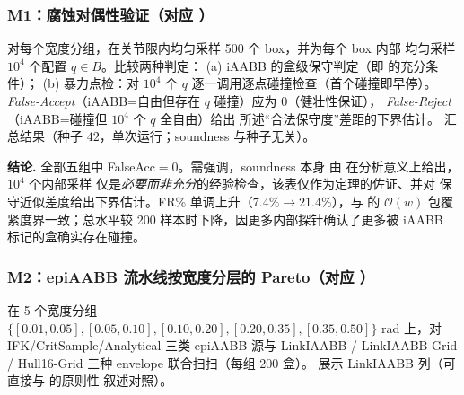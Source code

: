 \documentclass[journal]{IEEEtran}
\begin{document}
\subsubsection{M1：腐蚀对偶性验证（对应 ）}
对每个宽度分组，在关节限内均匀采样 500 个 box，并为每个 box 内部
均匀采样 $10^{4}$ 个配置 $q\in B$。比较两种判定：
(a) iAABB 的盒级保守判定（即
 的充分条件）；
(b) 暴力点检：对 $10^{4}$ 个 $q$ 逐一调用逐点碰撞检查（首个碰撞即早停）。
\emph{False-Accept}（iAABB=自由但存在 $q$ 碰撞）应为 $0$（健壮性保证），
\emph{False-Reject}（iAABB=碰撞但 $10^{4}$ 个 $q$ 全自由）给出
 所述“合法保守度”差距的下界估计。
 汇总结果（种子 $42$，单次运行；soundness 与种子无关）。

\begin{table}[ht]
\centering
\caption{腐蚀对偶性验证（M1）。}
\label{tab:m1_erosion}
\end{table}

\textbf{结论.} 全部五组中 FalseAcc$=0$。需强调，soundness 本身
由  在分析意义上给出，$10^{4}$ 个内部采样
仅是\emph{必要而非充分}的经验检查，该表仅作为定理的佐证、并对
保守近似差度给出下界估计。FR\% 单调上升（$7.4\%\!\to\!21.4\%$），与
 的 $\mathcal{O}(w)$ 包覆紧度界一致；总水平较 200
样本时下降，因更多内部探针确认了更多被 iAABB 标记的盒确实存在碰撞。

\subsubsection{M2：epiAABB 流水线按宽度分层的 Pareto（对应 ）}
在 5 个宽度分组 $\{[0.01,0.05],[0.05,0.10],[0.10,0.20],[0.20,0.35],[0.35,0.50]\}$ rad
上，对 IFK/CritSample/Analytical 三类 epiAABB 源与
LinkIAABB / LinkIAABB-Grid / Hull16-Grid 三种 envelope 联合扫扫（每组 200 盒）。
 展示 LinkIAABB 列（可直接与  的原则性
叙述对照）。
\end{document}
